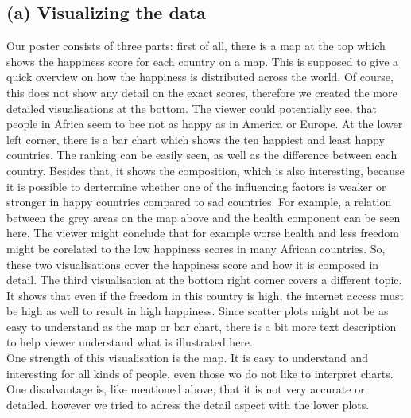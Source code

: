 \documentclass[a4paper]{article}
\begin{document}
\subsection*{(a) Visualizing the data}
Our poster consists of three parts: first of all, there is a map at the top which shows the happiness score for each country on a map. 
This is supposed to give a quick overview on how the happiness is distributed across the world. 
Of course, this does not show any detail on the exact scores, therefore we created the more detailed visualisations at the bottom. 
The viewer could potentially see, that people in Africa seem to bee not as happy as in America or Europe.  
At the lower left corner, there is a bar chart which shows the ten happiest and least happy countries. 
The ranking can be easily seen, as well as the difference between each country. 
Besides that, it shows the composition, which is also interesting, because it is possible to dertermine whether one of the influencing factors is weaker or stronger in happy countries compared to sad countries. 
For example, a relation between the grey areas on the map above and the health component can be seen here. 
The viewer might conclude that for example worse health and less freedom might be corelated to the low happiness scores in many African countries. 
So, these two visualisations cover the happiness score and how it is composed in detail. 
The third visualisation at the bottom right corner covers a different topic. 
It shows that even if the freedom in this country is high, the internet access must be high as well to result in high happiness. 
Since scatter plots might not be as easy to understand as the map or bar chart, there is a bit more text description to help viewer understand what is illustrated here. \\ \linebreak
One strength of this visualisation is the map. 
It is easy to understand and interesting for all kinds of people, even those wo do not like to interpret charts. 
One disadvantage is, like mentioned above, that it is not very accurate or detailed. 
however we tried to adress the detail aspect with the lower plots. 
\end{document}
